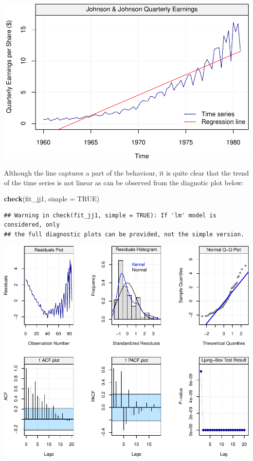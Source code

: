 \documentclass[]{book}
\newenvironment{Shaded}{\begin{snugshade}}{\end{snugshade}}
\newcommand{\KeywordTok}[1]{\textcolor[rgb]{0.13,0.29,0.53}{\textbf{#1}}}
\newcommand{\DataTypeTok}[1]{\textcolor[rgb]{0.13,0.29,0.53}{#1}}
\newcommand{\OtherTok}[1]{\textcolor[rgb]{0.56,0.35,0.01}{#1}}
\newcommand{\NormalTok}[1]{#1}
\theoremstyle{definition}
\theoremstyle{definition}
\theoremstyle{definition}
\theoremstyle{remark}
\begin{document}
\begin{center}\includegraphics{ts_files/figure-latex/jjexample2-1} \end{center}

Although the line captures a part of the behaviour, it is quite clear
that the trend of the time series is not linear as can be observed from
the diagnotic plot below:

\begin{Shaded}
\begin{Highlighting}[]
\KeywordTok{check}\NormalTok{(fit_jj1, }\DataTypeTok{simple =} \OtherTok{TRUE}\NormalTok{)}
\end{Highlighting}
\end{Shaded}

\begin{verbatim}
## Warning in check(fit_jj1, simple = TRUE): If 'lm' model is considered, only
## the full diagnostic plots can be provided, not the simple version.
\end{verbatim}

\begin{center}\includegraphics{ts_files/figure-latex/lmresid-1} \end{center}
\end{document}
